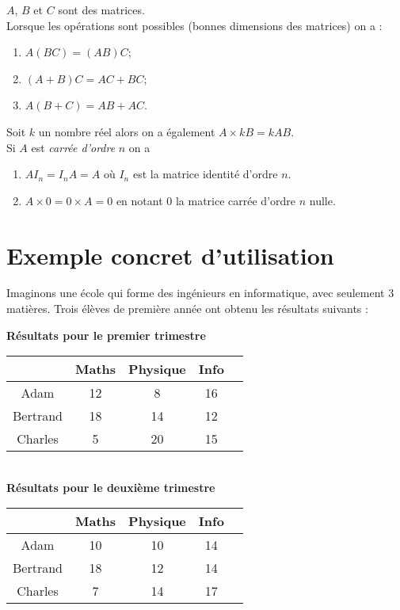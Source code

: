 \documentclass[a4paper,12pt]{book}
\begin{document}
\begin{propriete}[s de calcul]

$A$, $B$ et $C$ sont des matrices.\\
Lorsque les opérations sont possibles (bonnes dimensions des matrices) on a :
\begin{enumerate}[\textbullet]
	\item 	$A(BC)=(AB)C$;
	\item 	$(A+B)C=AC+BC$;
	\item 	$A(B+C)=AB+AC$.\\
\end{enumerate}
Soit $k$ un nombre réel alors on a également $A\times kB=kAB$.\\

Si $A$ est \textit{carrée d'ordre} $n$ on a
\begin{enumerate}[\textbullet]
	\item 	$AI_n=I_nA=A$ où $I_n$ est la matrice identité d'ordre $n$.
	\item 	$A\times 0=0\times A=0$ en notant 0 la matrice carrée d'ordre $n$ nulle.
\end{enumerate}
\end{propriete}

\section{Exemple concret d'utilisation}

Imaginons une école qui forme des ingénieurs en informatique, avec seulement 3 matières.
Trois élèves de première année ont obtenu les résultats suivants :

\begin{center}
\textbf{Résultats pour le premier trimestre}\\[1em]

\begin{tabular}{|c|c|c|c|c|}
\hline
 & Maths & Physique & Info\\
\hline
Adam & 12 & 8 & 16\\
\hline
Bertrand & 18 & 14 & 12\\
\hline
Charles & 5 & 20 & 15\\
\hline
\end{tabular}\ \\[2em]

\textbf{Résultats pour le deuxième trimestre}\\[1em]

\begin{tabular}{|c|c|c|c|c|}
\hline
 & Maths & Physique & Info\\
\hline
Adam & 10 & 10 & 14\\
\hline
Bertrand & 18 & 12 & 14\\
\hline
Charles & 7 & 14 & 17\\
\hline
\end{tabular}
\end{center}
\end{document}
